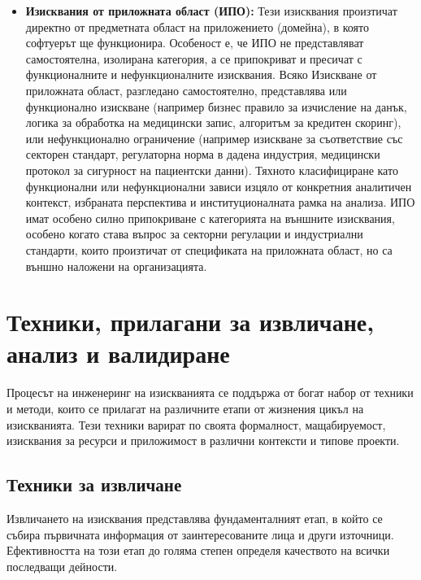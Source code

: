 \documentclass{scrartcl}
\begin{document}
\begin{FlushLeft}
\begin{itemize}
    \item \textbf{Изисквания от приложната област (ИПО):} Тези изисквания произтичат директно от предметната област на приложението (домейна), в която софтуерът ще функционира. Особеност е, че ИПО не представляват самостоятелна, изолирана категория, а се припокриват и пресичат с функционалните и нефункционалните изисквания. Всяко Изискване от приложната област, разгледано самостоятелно, представлява или функционално изискване (например бизнес правило за изчисление на данък, логика за обработка на медицински запис, алгоритъм за кредитен скоринг), или нефункционално ограничение (например изискване за съответствие със секторен стандарт, регулаторна норма в дадена индустрия, медицински протокол за сигурност на пациентски данни). Тяхното класифициране като функционални или нефункционални зависи изцяло от конкретния аналитичен контекст, избраната перспектива и институционалната рамка на анализа. ИПО имат особено силно припокриване с категорията на външните изисквания, особено когато става въпрос за секторни регулации и индустриални стандарти, които произтичат от спецификата на приложната област, но са външно наложени на организацията.
\end{itemize}

\section{Техники, прилагани за извличане, анализ и валидиране}

Процесът на инженеринг на изискванията се поддържа от богат набор от техники и методи, които се прилагат на различните етапи от жизнения цикъл на изискванията. Тези техники варират по своята формалност, мащабируемост, изисквания за ресурси и приложимост в различни контексти и типове проекти.

\subsection{Техники за извличане}

Извличането на изисквания представлява фундаменталният етап, в който се събира първичната информация от заинтересованите лица и други източници. Ефективността на този етап до голяма степен определя качеството на всички последващи дейности.


\end{FlushLeft}
\end{document}
